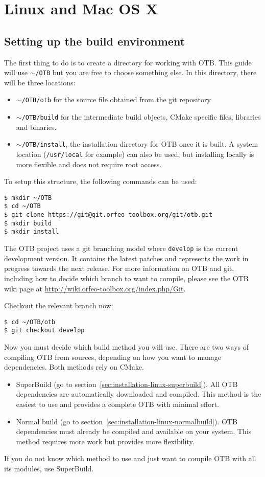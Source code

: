 \section{Linux and Mac OS X}
\label{sec:compiling-linux}

\subsection{Setting up the build environment}

The first thing to do is to create a directory for working with OTB.
This guide will use \texttt{$\sim$/OTB} but you are free to choose something else.
In this directory, there will be three locations:
\begin{itemize}
\item \texttt{$\sim$/OTB/otb} for the source file obtained from the git repository
\item \texttt{$\sim$/OTB/build} for the intermediate build objects, CMake specific files, libraries and binaries.
\item \texttt{$\sim$/OTB/install}, the installation directory for OTB once it is built.
A system location (\texttt{/usr/local} for example) can also be used, but installing locally is more flexible and does
not require root access.
\end{itemize}
To setup this structure, the following commands can be used:
\begin{verbatim}
$ mkdir ~/OTB
$ cd ~/OTB
$ git clone https://git@git.orfeo-toolbox.org/git/otb.git
$ mkdir build
$ mkdir install
\end{verbatim}

The OTB project uses a git branching model where \texttt{develop} is the current development version.
It contains the latest patches and represents the work in progress towards the next release.
For more information on OTB and git, including how to decide which branch to want to compile, please see the
OTB wiki page at \url{http://wiki.orfeo-toolbox.org/index.php/Git}.

Checkout the relevant branch now:
\begin{verbatim}
$ cd ~/OTB/otb
$ git checkout develop
\end{verbatim}

Now you must decide which build method you will use.
There are two ways of compiling OTB from sources, depending on how you want to manage dependencies.
Both methods rely on CMake.
\begin{itemize}
\item SuperBuild (go to section~\ref{sec:installation-linux-superbuild}). All OTB dependencies are automatically downloaded and compiled.
This method is the easiest to use and provides a complete OTB with minimal effort.
\item Normal build (go to section~\ref{sec:installation-linux-normalbuild}). OTB dependencies must already be compiled and available on your system.
This method requires more work but provides more flexibility.
\end{itemize}
If you do not know which method to use and just want to compile OTB with all its modules, use SuperBuild.

